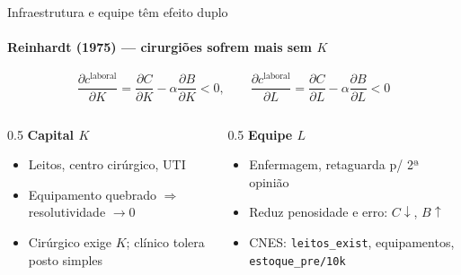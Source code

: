 \documentclass[10pt,aspectratio=169]{beamer}
\begin{document}
\begin{frame}{Infraestrutura e equipe têm efeito duplo}
\framesubtitle{Reinhardt (1975) — cirurgiões sofrem mais sem $K$}
\begin{equation*}
\frac{\partial c^{\text{laboral}}}{\partial K}
= \frac{\partial C}{\partial K} - \alpha\frac{\partial B}{\partial K} < 0,
\qquad
\frac{\partial c^{\text{laboral}}}{\partial L}
= \frac{\partial C}{\partial L} - \alpha\frac{\partial B}{\partial L} < 0
\end{equation*}
\begin{columns}[T]
\begin{column}{0.5\textwidth}
\textbf{Capital $K$}
\begin{itemize}
  \item Leitos, centro cirúrgico, UTI
  \item Equipamento quebrado $\Rightarrow$ resolutividade $\to 0$
  \item Cirúrgico exige $K$; clínico tolera posto simples
\end{itemize}
\end{column}
\begin{column}{0.5\textwidth}
\textbf{Equipe $L$}
\begin{itemize}
  \item Enfermagem, retaguarda p/ 2ª opinião
  \item Reduz penosidade e erro: $C \downarrow$, $B \uparrow$
  \item CNES: \texttt{leitos\_exist}, equipamentos, \texttt{estoque\_pre/10k}
\end{itemize}
\end{column}
\end{columns}
\end{frame}
\end{document}
